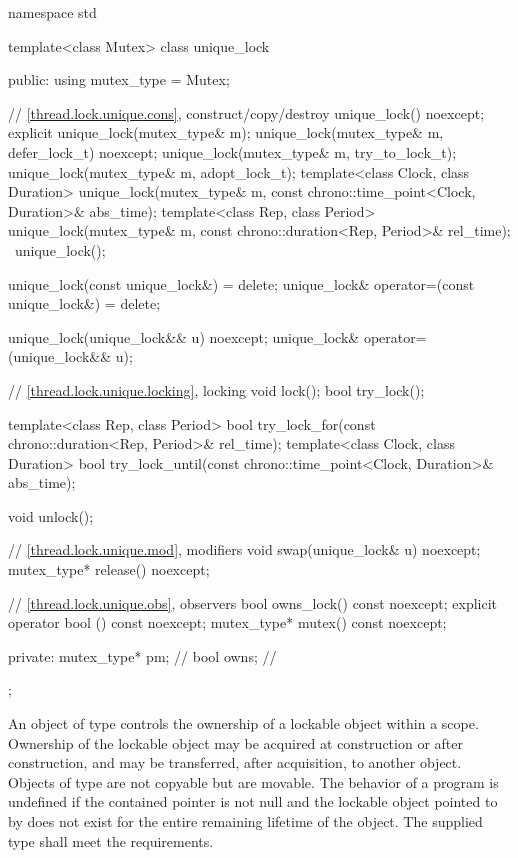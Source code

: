 %
\begin{codeblock}
namespace std {
  template<class Mutex>
  class unique_lock {
  public:
    using mutex_type = Mutex;

    // \ref{thread.lock.unique.cons}, construct/copy/destroy
    unique_lock() noexcept;
    explicit unique_lock(mutex_type& m);
    unique_lock(mutex_type& m, defer_lock_t) noexcept;
    unique_lock(mutex_type& m, try_to_lock_t);
    unique_lock(mutex_type& m, adopt_lock_t);
    template<class Clock, class Duration>
      unique_lock(mutex_type& m, const chrono::time_point<Clock, Duration>& abs_time);
    template<class Rep, class Period>
      unique_lock(mutex_type& m, const chrono::duration<Rep, Period>& rel_time);
    ~unique_lock();

    unique_lock(const unique_lock&) = delete;
    unique_lock& operator=(const unique_lock&) = delete;

    unique_lock(unique_lock&& u) noexcept;
    unique_lock& operator=(unique_lock&& u);

    // \ref{thread.lock.unique.locking}, locking
    void lock();
    bool try_lock();

    template<class Rep, class Period>
      bool try_lock_for(const chrono::duration<Rep, Period>& rel_time);
    template<class Clock, class Duration>
      bool try_lock_until(const chrono::time_point<Clock, Duration>& abs_time);

    void unlock();

    // \ref{thread.lock.unique.mod}, modifiers
    void swap(unique_lock& u) noexcept;
    mutex_type* release() noexcept;

    // \ref{thread.lock.unique.obs}, observers
    bool owns_lock() const noexcept;
    explicit operator bool () const noexcept;
    mutex_type* mutex() const noexcept;

  private:
    mutex_type* pm;             // \expos
    bool owns;                  // \expos
  };
}
\end{codeblock}

\pnum
An object of type  controls the ownership of a lockable
object within a scope. Ownership of the lockable object may be acquired at
construction or after construction, and may be transferred, after
acquisition, to another  object. Objects of type  are not
copyable but are movable. The behavior of a program is undefined if the contained pointer
 is not null and the lockable object pointed
to by  does not exist for the entire remaining
lifetime of the  object. The supplied
 type shall meet the 
requirements.

